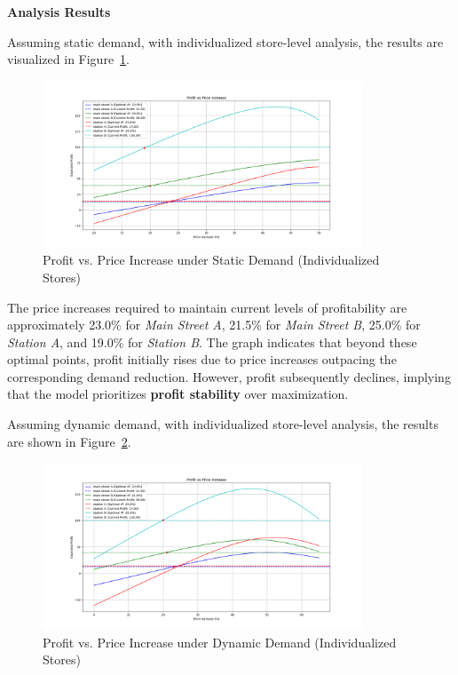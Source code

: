 \newpage
\noindent\textbf{Analysis Results}
\medskip


Assuming static demand, with individualized store-level analysis, the results are visualized in Figure~\ref{fig:static}.

\begin{figure}[H]
    \centering
    \includegraphics[width=0.85\textwidth]{Static Demand but individual stores.png}
    \caption{Profit vs. Price Increase under Static Demand (Individualized Stores)}
    \label{fig:static}
\end{figure}


The price increases required to maintain current levels of profitability are approximately 23.0\% for \textit{Main Street A}, 21.5\% for \textit{Main Street B}, 25.0\% for \textit{Station A}, and 19.0\% for \textit{Station B}. The graph indicates that beyond these optimal points, profit initially rises due to price increases outpacing the corresponding demand reduction. However, profit subsequently declines, implying that the model prioritizes \textbf{profit stability} over maximization.

\vspace{1em}

Assuming dynamic demand, with individualized store-level analysis, the results are shown in Figure~\ref{fig:dynamic}.

\begin{figure}[H]
    \centering
    \includegraphics[width=0.85\textwidth]{Dynamic Demand.png}
    \caption{Profit vs. Price Increase under Dynamic Demand (Individualized Stores)}
    \label{fig:dynamic}
\end{figure}

